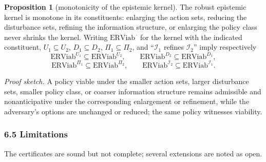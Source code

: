 \documentclass[10pt,twocolumn]{article}
\theoremstyle{definition}
\newtheorem{proposition}{Proposition}
\begin{document}
\begin{proposition}[monotonicity of the epistemic kernel]\label{prop:monotone}
The robust epistemic kernel is monotone in its constituents: enlarging
the action sets, reducing the disturbance sets, refining the information
structure, or enlarging the policy class never shrinks the kernel.
Writing \(\mathrm{ERViab}^{\,\cdot}\) for the kernel with the indicated
constituent, \(U_1\subseteq U_2\), \(D_1\subseteq D_2\),
\(\Pi_1\subseteq\Pi_2\), and ``\(\mathcal{I}_1\) refines
\(\mathcal{I}_2\)'' imply respectively
\[\mathrm{ERViab}^{U_1} \subseteq \mathrm{ERViab}^{U_2}, \qquad
\mathrm{ERViab}^{D_2} \subseteq \mathrm{ERViab}^{D_1},\]
\[\mathrm{ERViab}^{\Pi_1} \subseteq \mathrm{ERViab}^{\Pi_2}, \qquad
\mathrm{ERViab}^{\mathcal{I}_2} \subseteq \mathrm{ERViab}^{\mathcal{I}_1}.\]
\end{proposition}

\emph{Proof sketch.} A policy viable under the smaller action sets, larger disturbance sets, smaller policy class, or coarser information structure remains admissible and nonanticipative under the corresponding enlargement or refinement, while the adversary's options are unchanged or reduced; the same policy witnesses viability.

\subsubsection{6.5 Limitations}\label{limitations}

The certificates are sound but not complete; several extensions are noted as open.
\end{document}

